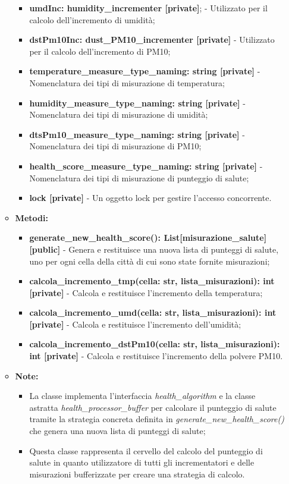 \begin{itemize}
\begin{itemize}
\begin{itemize}
        \item \textbf{umdInc: humidity\_incrementer [private]}; - Utilizzato per il calcolo dell'incremento di umidità;
        \item \textbf{dstPm10Inc: dust\_PM10\_incrementer [private]} - Utilizzato per il calcolo dell'incremento di PM10;
        \item \textbf{temperature\_measure\_type\_naming: string [private]} - Nomenclatura dei tipi di misurazione di temperatura;
        \item \textbf{humidity\_measure\_type\_naming: string [private]} - Nomenclatura dei tipi di misurazione di umidità;
        \item \textbf{ dtsPm10\_measure\_type\_naming: string [private]} - Nomenclatura dei tipi di misurazione di PM10;
        \item \textbf{ health\_score\_measure\_type\_naming: string [private]} - Nomenclatura dei tipi di misurazione di punteggio di salute;
        \item \textbf{lock [private]} - Un oggetto lock per gestire l'accesso concorrente.
    \end{itemize}
    \item \textbf{Metodi:}
    \begin{itemize}
        \item \textbf{generate\_new\_health\_score(): List[misurazione\_salute] [public]} - Genera e restituisce una nuova lista di punteggi di salute, uno per ogni cella della città di cui sono state fornite misurazioni;
        \item \textbf{calcola\_incremento\_tmp(cella: str, lista\_misurazioni): int [private]} - Calcola e restituisce l'incremento della temperatura;
        \item \textbf{calcola\_incremento\_umd(cella: str, lista\_misurazioni): int [private]} - Calcola e restituisce l'incremento dell'umidità;
        \item \textbf{calcola\_incremento\_dstPm10(cella: str, lista\_misurazioni): int [private]} - Calcola e restituisce l'incremento della polvere PM10.
    \end{itemize}
    \item\textbf{Note:}
        \begin{itemize}
            \item La classe implementa l'interfaccia \textit{health\_algorithm} e la classe astratta \textit{health\_processor\_buffer} per calcolare il punteggio di salute tramite la strategia concreta definita in \textit{generate\_new\_health\_score()} che genera una nuova lista di punteggi di salute;
            \item Questa classe rappresenta il cervello del calcolo del punteggio di salute in quanto utilizzatore di tutti gli incrementatori e delle misurazioni bufferizzate per creare una strategia di calcolo.
        \end{itemize}
    \end{itemize}


\end{itemize}
